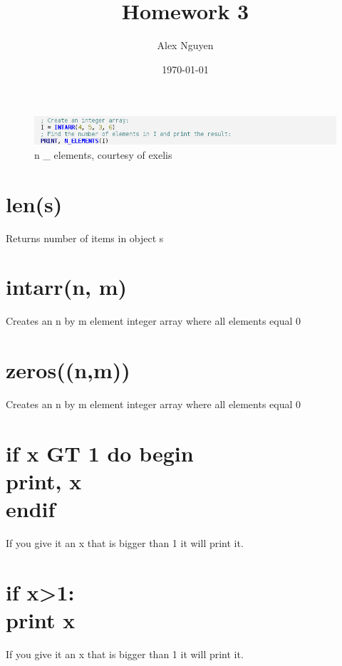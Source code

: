 \documentclass[a4paper,twoside,10pt]{report}
\title{Homework 3}
\date{\today}
\author{Alex Nguyen}
\begin{document}
\begin{figure}
\centering
\includegraphics{tut8_image1.png}
\caption{n \_ elements, courtesy of exelis}
\end{figure}
\section{len(s)}
Returns number of items in object s
\section{intarr(n, m)}
Creates an n by m element integer array where all elements equal 0
\section{zeros((n,m))}
Creates an n by m element integer array where all elements equal 0
\section{if x GT 1 do begin \\
     \indent print, x \\
  endif}
If you give it an x that is bigger than 1 it will print it.
\section{if x>1: \\
       \indent print x}
If you give it an x that is bigger than 1 it will print it.
\end{document}

